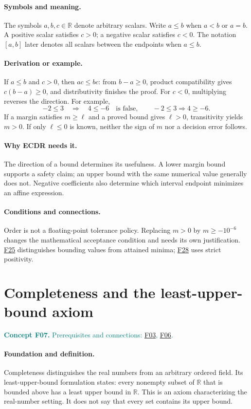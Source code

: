 \documentclass[11pt,a4paper]{article}
\newcommand{\R}{\mathbb R}
\newcommand{\conceptid}{Front matter}
\newcommand{\concept}[3]{\clearpage\renewcommand{\conceptid}{#1}%
\section{#2}\label{concept:#1}%
\textcolor{teal}{\textbf{Concept #1.} Prerequisites and connections: #3.}\par
\typeout{ECDR-CONCEPT-START #1 PAGE=\thepage}}
\begin{document}
\paragraph{Symbols and meaning.}
The symbols $a,b,c\in\R$ denote arbitrary scalars. Write $a\le b$
when $a<b$ or $a=b$. A positive scalar satisfies $c>0$; a negative scalar
satisfies $c<0$. The notation $[a,b]$ later denotes all scalars between
the endpoints when $a\le b$.
\paragraph{Derivation or example.}
If $a\le b$ and $c>0$, then $ac\le bc$: from $b-a\ge0$, product
compatibility gives $c(b-a)\ge0$, and distributivity finishes the proof.
For $c<0$, multiplying reverses the direction. For example,
\[
 -2\le3\quad\Rightarrow\quad 4\le-6
 \quad\text{is false},\qquad -2\le3\Rightarrow4\ge-6.
\]
If a margin satisfies $m\ge\ell$ and a proved bound gives $\ell>0$,
transitivity yields $m>0$. If only $\ell\le0$ is known, neither the
sign of $m$ nor a decision error follows.
\paragraph{Why ECDR needs it.}
The direction of a bound determines its usefulness. A lower margin bound
supports a safety claim; an upper bound with the same numerical value
generally does not. Negative coefficients also determine which interval
endpoint minimizes an affine expression.
\paragraph{Conditions and connections.}
Order is not a floating-point tolerance policy. Replacing $m>0$ by
$m\ge-10^{-6}$ changes the mathematical acceptance condition and needs
its own justification. \hyperref[concept:F25]{F25} distinguishes bounding values from attained
minima; \hyperref[concept:F28]{F28} uses strict positivity.
\par\label{endconcept:F06}

\concept{F07}{Completeness and the least-upper-bound axiom}{\hyperref[concept:F03]{F03}, \hyperref[concept:F06]{F06}}
\paragraph{Foundation and definition.}
Completeness distinguishes the real numbers from an arbitrary ordered
field. Its least-upper-bound formulation states: every nonempty subset
of $\R$ that is bounded above has a least upper bound in $\R$. This is
an axiom characterizing the real-number setting. It does not say that
every set contains its upper bound.
\end{document}
